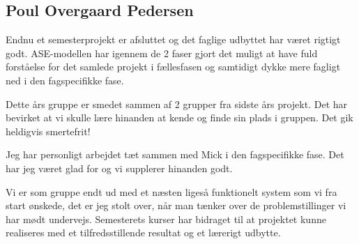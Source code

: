 \subsection*{Poul Overgaard Pedersen}

Endnu et semesterprojekt er afsluttet og det faglige udbyttet har været rigtigt godt. ASE-modellen har igennem de 2 faser gjort det muligt at have fuld forståelse for det samlede projekt i fællesfasen og samtidigt dykke mere fagligt ned i den fagspecifikke fase. 

Dette års gruppe er smedet sammen af 2 grupper fra sidste års projekt. Det har bevirket at vi skulle lære hinanden at kende og finde sin plads i gruppen. Det gik heldigvis smertefrit! 

Jeg har personligt arbejdet tæt sammen med Mick i den fagspecifikke fase. Det har jeg været glad for og vi supplerer hinanden godt. 

Vi er som gruppe endt ud med et næsten ligeså funktionelt system som vi fra start ønskede, det er jeg stolt over, når man tænker over de problemstillinger vi har mødt undervejs. Semesterets kurser har bidraget til at projektet kunne realiseres med et tilfredsstillende resultat og et lærerigt udbytte. 
